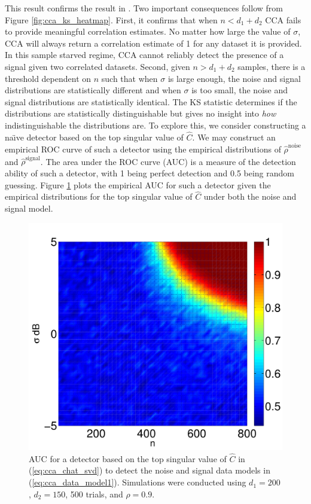 This result confirms the result in \cite{nadakuditi2011fundamental}. Two important
consequences follow from Figure \ref{fig:cca_ks_heatmap}. First, it confirms that when
$n<d_1+d_2$ CCA fails to provide meaningful correlation estimates. No matter how large the
value of $\sigma$, CCA will always return a correlation estimate of 1 for any dataset it
is provided. In this sample starved regime, CCA cannot reliably detect the presence of a
signal given two correlated datasets. Second, given $n>d_1+d_2$ samples, there is a
threshold dependent on $n$ such that when $\sigma$ is large enough, the noise and signal
distributions are statistically different and when $\sigma$ is too small, the noise and
signal distributions are statistically identical. The KS statistic determines if the
distributions are statistically distinguishable but gives no insight into \textit{how}
indistinguishable the distributions are. To explore this, we consider constructing a
na\"{\i}ve detector based on the top singular value of $\widehat{C}$. We may construct an
empirical ROC curve of such a detector using the empirical distributions of
$\widehat{\rho}^{\text{noise}}$ and $\widehat{\rho}^{\text{signal}}$. The area under the
ROC curve (AUC) is a measure of the detection ability of such a detector, with 1 being
perfect detection and 0.5 being random guessing. Figure \ref{fig:cca_auc_heatmap} plots
the empirical AUC for such a detector given the empirical distributions for the top
singular value of $\widehat{C}$ under both the noise and signal model.

\begin{figure}
  \centering\includegraphics[width=\figwidth]{figures/cca_auc_heatmap.pdf}
  \caption{AUC for a detector based on the top singular value of $\widehat{C}$ in
    (\ref{eq:cca_chat_svd}) to detect the noise and signal data models in
    (\ref{eq:cca_data_model1}). Simulations were conducted using $d_1=200$, $d_2=150$, 500
    trials, and $\rho=0.9$.}
  \label{fig:cca_auc_heatmap}
\end{figure}

